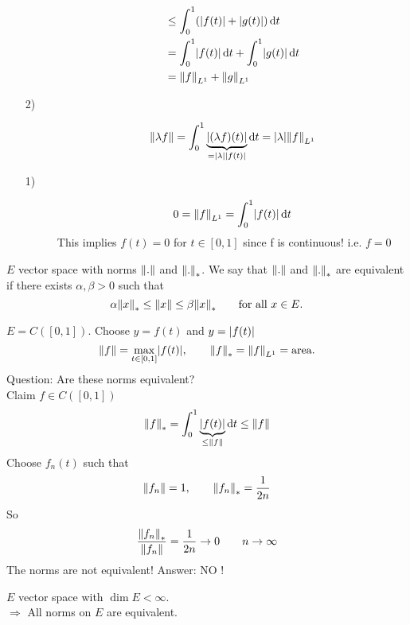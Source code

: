 \begin{beispiele}
\begin{enumerate}[(1)]
\begin{description}
\begin{align*}
			&\leq \int_{0}^{1}(\abs{f(t)}+ \abs{g(t)}) \,\mathrm{d}t \\
			&= \int_{0}^{1}\abs{f(t)} \,\mathrm{d}t + \int_{0}^{1}\abs{g(t)} \,\mathrm{d}t \\
			&= \norm{f}_{L^1} + \norm{g}_{L^1}
		\end{align*}
		\item[2)] \[
			\norm{\lambda f} = \int_{0}^{1} \underset{= \abs{\lambda}\abs{f(t)}}{\underbrace{\abs{(\lambda f)(t)}}} \,\mathrm{d}t = \abs{\lambda} \norm{f}_{L^1}
		\]
		\item[1)] \[
			0 = \norm{f}_{L^1} = \int_{0}^{1}\abs{f(t)} \,\mathrm{d}t
		\]
		This implies $f(t)=0$ for $t \in [0,1]$ since f is continuous! i.e. $f=0$
	\end{description}
	\end{enumerate}
\end{beispiele}
\begin{theorem*}
	$E$ vector space with norms $\norm{.}$ and $\norm{.}_{*}$. We say that $\norm{.}$ and $\norm{.}_{*}$ are equivalent if there exists $\alpha, \beta >0$ such that
	\[
		\alpha \norm{x}_{*} \leq \norm{x} \leq \beta \norm{x}_{*} \qquad \text{for all }x \in E.
	\]
\end{theorem*}
\begin{beispiel}
		\item $E = C([0,1])$. Choose $y = f(t)$ and $y = \lvert f(t)\rvert$
		\[
			\norm{f} = \max\limits_{t \in [0,1]} \abs{f(t)}, \qquad \norm{f}_{*} = \norm{f}_{L^1} = \text{area}.
		\]
		Question: Are these norms equivalent? \\
		Claim $f \in C([0,1])$ 
		\[
			\norm{f}_{*} = \int_{0}^{1} \underset{\leq \norm{f}}{\underbrace{\abs{f(t)}}} \,\mathrm{d}t \leq \norm{f}
		\]
		Choose $f_n(t)$ such that
		\[
			\norm{f_n} = 1, \qquad \norm{f_n}_{*} = \frac{1}{2n}
		\]
		So 
		\[
			\frac{\norm{f_n}_{*}}{\norm{f_n}} = \frac{1}{2n} \to 0 \qquad n \to \infty
		\]
		The norms are not equivalent! Answer: NO ! 
	\end{beispiel}
\begin{theorem*}
	$E$ vector space with $\dim E < \infty$.  \\
	$\Rightarrow $ All norms on $E$ are equivalent.
\end{theorem*}
